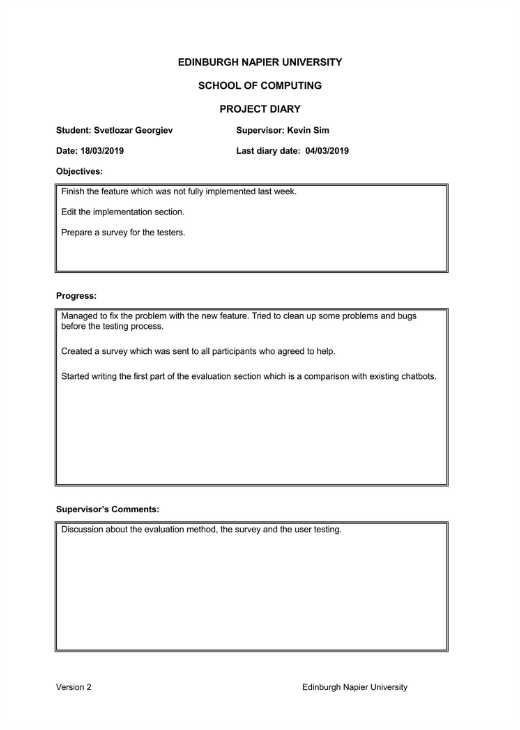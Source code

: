 \documentclass[12pt,a4paper]{article}
\begin{document}
\begin{appendices}
\includegraphics[width=\textwidth,height=\textheight,keepaspectratio]{s2week8.jpg}
\newpage

\end{appendices}
\end{document}
